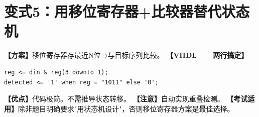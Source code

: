 \section{变式5：用移位寄存器+比较器替代状态机}

\begin{detailbox}[完整教学]
\textbf{【方案】}移位寄存器存最近N位→与目标序列比较。
\textbf{【VHDL——两行搞定】}
\begin{lstlisting}
reg <= din & reg(3 downto 1);
detected <= '1' when reg = "1011" else '0';
\end{lstlisting}
\textbf{【优点】}代码极简。不需推导状态转移。
\textbf{【注意】}自动实现重叠检测。
\textbf{【考试适用】}除非题目明确要求"用状态机设计"，否则移位寄存器方案是最佳选择。
\end{detailbox}
